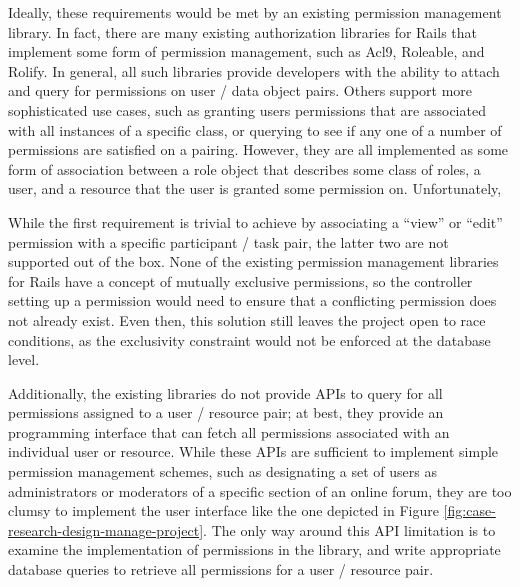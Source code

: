 \documentclass[document.tex]{subfiles}
\begin{document}
Ideally, these requirements would be met by an existing permission management library.
In fact, there are many existing authorization libraries for Rails that implement some form of permission management, such as Acl9, Roleable, and Rolify.
In general, all such libraries provide developers with the ability to attach and query for permissions on user / data object pairs.
Others support more sophisticated use cases, such as granting users permissions that are associated with all instances of a specific class, or querying to see if any one of a number of permissions are satisfied on a pairing.
However, they are all implemented as some form of association between a role object that describes some class of roles, a user, and a resource that the user is granted some permission on. Unfortunately, 

While the first requirement is trivial to achieve by associating a ``view'' or ``edit'' permission with a specific participant / task pair, the latter two are not supported out of the box.
None of the existing permission management libraries for Rails have a concept of
mutually exclusive permissions, so the controller setting up a permission would need to ensure that a conflicting permission does not already exist.
Even then, this solution still leaves the project open to race conditions, as the exclusivity constraint would not be enforced at the database level.

Additionally, the existing libraries do not provide APIs to query for all permissions assigned to a user / resource pair; at best, they provide an programming interface that can fetch all permissions associated with an individual user or resource.
While these APIs are sufficient to implement simple permission management schemes, such as designating a set of users as administrators or moderators of a specific section of an online forum, they are too clumsy to implement the user interface like the one depicted in Figure \ref{fig:case-research-design-manage-project}.
The only way around this API limitation is to examine the implementation of permissions in the library, and write appropriate database queries to retrieve all permissions for a user / resource pair.
\end{document}
